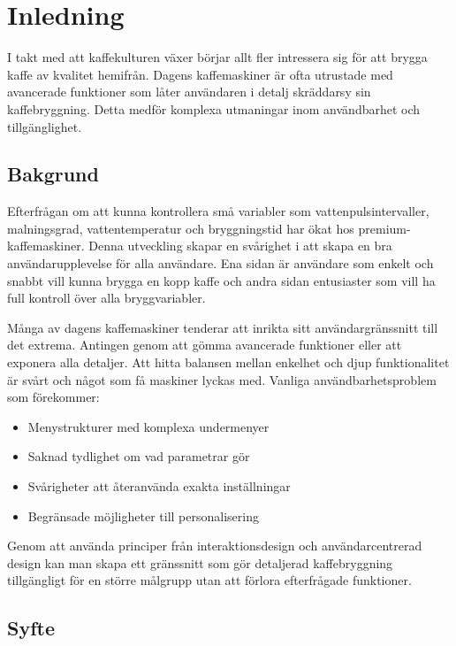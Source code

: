 \section{Inledning}

I takt med att kaffekulturen växer börjar allt fler intressera sig för att brygga kaffe av kvalitet hemifrån. Dagens kaffemaskiner är ofta utrustade med avancerade funktioner som låter användaren i detalj skräddarsy sin kaffebryggning. Detta medför komplexa utmaningar inom användbarhet och tillgänglighet. 

\subsection{Bakgrund}

Efterfrågan om att kunna kontrollera små variabler som vattenpulsintervaller, malningsgrad, vattentemperatur och bryggningstid har ökat hos premium-kaffemaskiner. Denna utveckling skapar en svårighet i att skapa en bra användarupplevelse för alla användare. Ena sidan är användare som enkelt och snabbt vill kunna brygga en kopp kaffe och andra sidan entusiaster som vill ha full kontroll över alla bryggvariabler.

Många av dagens kaffemaskiner tenderar att inrikta sitt användargränssnitt till det extrema. Antingen genom att gömma avancerade funktioner eller att exponera alla detaljer. Att hitta balansen mellan enkelhet och djup funktionalitet är svårt och något som få maskiner lyckas med. Vanliga användbarhetsproblem som förekommer:

\begin{itemize}
    \item Menystrukturer med komplexa undermenyer
    \item Saknad tydlighet om vad parametrar gör
    \item Svårigheter att återanvända exakta inställningar
    \item Begränsade möjligheter till personalisering
\end{itemize}

Genom att använda principer från interaktionsdesign och användarcentrerad design kan man skapa ett gränssnitt som gör detaljerad kaffebryggning tillgängligt för en större målgrupp utan att förlora efterfrågade funktioner. 

\subsection{Syfte}


